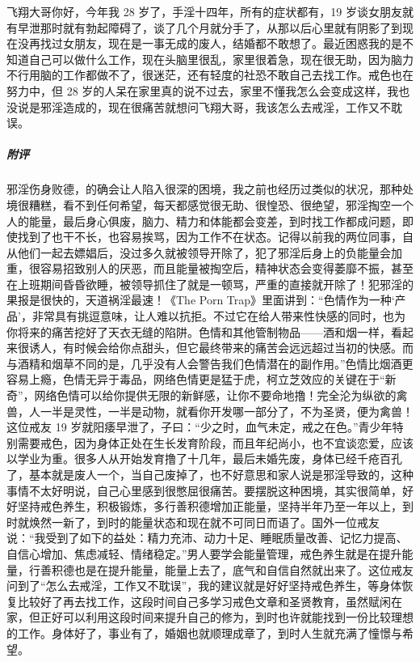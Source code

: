 \begin{case}
    飞翔大哥你好，今年我 28 岁了，手淫十四年，所有的症状都有，19 岁谈女朋友就有早泄那时就有勃起障碍了，谈了几个月就分手了，从那以后心里就有阴影了到现在没再找过女朋友，现在是一事无成的废人，结婚都不敢想了。最近困惑我的是不知道自己可以做什么工作，现在头脑里很乱，家里很着急，现在很无助，因为脑力不行用脑的工作都做不了，很迷茫，还有轻度的社恐不敢自己去找工作。戒色也在努力中，但 28 岁的人呆在家里真的说不过去，家里不懂我怎么会变成这样，我也没说是邪淫造成的，现在很痛苦就想问飞翔大哥，我该怎么去戒淫，工作又不耽误。
    \subparagraph{附评} 邪淫伤身败德，的确会让人陷入很深的困境，我之前也经历过类似的状况，那种处境很糟糕，看不到任何希望，每天都感觉很无助、很惶恐、很绝望，邪淫掏空一个人的能量，最后身心俱废，脑力、精力和体能都会变差，到时找工作都成问题，即使找到了也干不长，也容易挨骂，因为工作不在状态。记得以前我的两位同事，自从他们一起去嫖娼后，没过多久就被领导开除了，犯了邪淫后身上的负能量会加重，很容易招致别人的厌恶，而且能量被掏空后，精神状态会变得萎靡不振，甚至在上班期间昏昏欲睡，被领导抓住了就是一顿骂，严重的直接就开除了！犯邪淫的果报是很快的，天道祸淫最速！《The Porn Trap》里面讲到：“色情作为一种‘产品’，非常具有挑逗意味，让人难以抗拒。不过它在给人带来性快感的同时，也为你将来的痛苦挖好了天衣无缝的陷阱。色情和其他管制物品——酒和烟一样，看起来很诱人，有时候会给你点甜头，但它最终带来的痛苦会远远超过当初的快感。而与酒精和烟草不同的是，几乎没有人会警告我们色情潜在的副作用。”色情比烟酒更容易上瘾，色情无异于毒品，网络色情更是猛于虎，柯立芝效应的关键在于“新奇”，网络色情可以给你提供无限的新鲜感，让你不要命地撸！完全沦为纵欲的禽兽，人一半是灵性，一半是动物，就看你开发哪一部分了，不为圣贤，便为禽兽！这位戒友 19 岁就阳痿早泄了，子曰：“少之时，血气未定，戒之在色。”青少年特别需要戒色，因为身体正处在生长发育阶段，而且年纪尚小，也不宜谈恋爱，应该以学业为重。很多人从开始发育撸了十几年，最后未婚先废，身体已经千疮百孔了，基本就是废人一个，当自己废掉了，也不好意思和家人说是邪淫导致的，这种事情不太好明说，自己心里感到很憋屈很痛苦。要摆脱这种困境，其实很简单，好好坚持戒色养生，积极锻炼，多行善积德增加正能量，坚持半年乃至一年以上，到时就焕然一新了，到时的能量状态和现在就不可同日而语了。国外一位戒友说：“我受到了如下的益处：精力充沛、动力十足、睡眠质量改善、记忆力提高、自信心增加、焦虑减轻、情绪稳定。”男人要学会能量管理，戒色养生就是在提升能量，行善积德也是在提升能量，能量上去了，底气和自信自然就出来了。这位戒友问到了“怎么去戒淫，工作又不耽误”，我的建议就是好好坚持戒色养生，等身体恢复比较好了再去找工作，这段时间自己多学习戒色文章和圣贤教育，虽然赋闲在家，但正好可以利用这段时间来提升自己的修为，到时也许就能找到一份比较理想的工作。身体好了，事业有了，婚姻也就顺理成章了，到时人生就充满了憧憬与希望。
\end{case}

